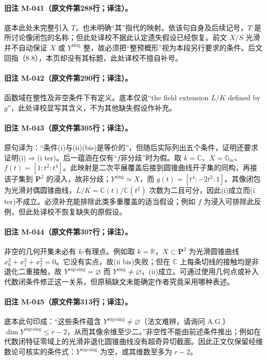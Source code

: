 \documentclass[UTF8,a4paper]{ctexbook}
\begin{document}
\paragraph{旧注 M-041（原文件第288行；译注）。}
底本此处未完整引入 $T$，也未明确“其”指代的映射。依该句自身及后续记号，$T$ 是所讨论像闭包的名称；但此处译校不据此认定遗失假设已经恢复。前文 $X/S$ 光滑并不自动保证 $X$ 或 ${Y^{\mathrm{sing}}}$ 整，故必须把“整预概形”视为本段另行要求的条件。后文回指（8.8），本页却没有其标题，此处译校不擅自补号。

\paragraph{旧注 M-042（原文件第290行；译注）。}
函数域在整性及非空条件下有定义。底本仅说“the field extension $L/K$ defined by $g$”，此处译校显写其含义，不为其他缺失假设作补充。

\paragraph{旧注 M-043（原文件第305行；译注）。}
原句译为：“条件(i)与(ii)(bis)是等价的”，但随后实际列出五个条件，证明还要求证明(i)$\Rightarrow$(i ter)。后一蕴涵在仅有“$f$非分歧”时为假。取 $k=\mathbb C$、$X=\mathbb G_m$、$f(t)=[1:t^2:t^4]$。此映射是二次平展覆盖后接到圆锥曲线开子集的同构，再接该子集到 $\mathbf P^2$ 的浸入，故非分歧；${Y^{\mathrm{sing}}}\simeq X$，而 $g(t)=[t^4:-2t^2:1]$。其像闭包为光滑对偶圆锥曲线，$L/K=\mathbb C(t)/\mathbb C(t^2)$ 次数为二且可分，因此(i)成立而(i ter)不成立。必须补充能排除此类多重覆盖的适当假设；例如 $f$ 为浸入可排除此反例，但此处译校不恢复缺失的原假设。

\paragraph{旧注 M-044（原文件第307行；译注）。}
非空的几何开集未必有 $k$-有理点。例如取 $k=\mathbb R$，$X\subset\mathbf P^2$ 为光滑圆锥曲线 $x_0^2+x_1^2+x_2^2=0$。它没有实点，故(ii bis)失败；但在 $\mathbb C$ 上每条切线的接触均是非退化二重接触，故 ${Y^{\mathrm{sup\,sing}}}=\varnothing$ 而 ${Y^{\mathrm{sing}}}\ne\varnothing$，(ii)成立。可通过使用几何点或补入代数闭条件修正这一关系，但原稿缺文未能确定作者究竟采用哪种表述。

\paragraph{旧注 M-045（原文件第313行；译注）。}
底本此句印成：“这些条件蕴含 ${Y^{\mathrm{sup\,sing}}}\ne\varnothing$〔法文难辨，请询问 A.G.〕$\dim{Y^{\mathrm{sup\,sing}}}\leq r-2$，从而其像余维至少二。”非空性不能由前述条件推出；例如在代数闭特征零域上的光滑非退化圆锥曲线没有超奇异切截面。因此正文仅保留经维数论可核实的条件式：${Y^{\mathrm{sup\,sing}}}$ 为空，或其维数至多为 $r-2$。
\end{document}
